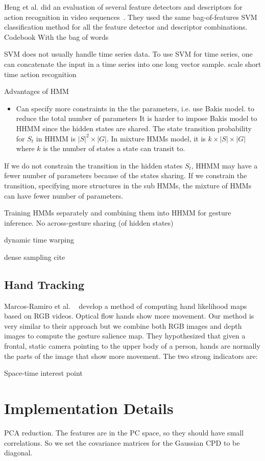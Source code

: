\documentclass{sigchi}
\begin{document}
Heng et al. did an evaluation of several feature detectors and descriptors for action
recognition in video sequences~\cite{wang2009}. They used the same bag-of-features SVM classification
method for all the feature detector and descriptor combinations.
Codebook With the bag of words

SVM does not usually handle time series data. To use SVM for time series, one
can concatenate the input in a time series into one long vector sample. scale
short time
action recognition

Advantages of HMM
~\cite{sharma00, Starner95}
\begin{itemize}
  \item Can specify more constraints in the the parameters, i.e. use Bakis model. to reduce the total number of parameters
It is harder to impose Bakis model to HHMM since the hidden states are shared. The state transition probability for $S_t$ in HHMM
is $|S|^2 \times |G| $. In mixture HMMs model, it is $k\times |S|\times|G|$ where $k$ is the number of states a state can transit to.
\end{itemize}

If we do not constrain the transition in the hidden states $S_t$, HHMM may have a fewer number of parameters because of the states sharing.
If we constrain the transition, specifying more structures in the sub HMMs, the mixture of HMMs can have fewer number of parameters.

Training HMMs separately and combining them into HHMM for gesture inference. No across-gesture sharing (of hidden states)

dynamic time warping

dense sampling cite
\subsection{Hand Tracking}
Marcos-Ramiro et al. ~\cite{marcos2013} develop a method of computing hand likelihood maps based on RGB videos. Optical flow
hands show more movement. Our method is very similar to their approach but we combine both RGB images and depth images to compute
the gesture salience map. They hypothesized that given a frontal, static camera pointing to the upper body of a person, hands are
normally the parts of the image that show more movement. The two strong indicators are:

Space-time interest point
\section{Implementation Details}
PCA reduction. The features are in the PC space, so they should have small correlations.
So we set the covariance matrices for the Gaussian CPD to be diagonal.
\end{document}
